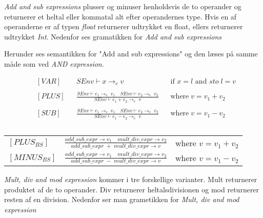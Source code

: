 \textit{Add and sub expressions} plusser og minuser henholdsvis de to operander og returnerer et heltal eller kommatal alt efter operandernes type. Hvis en af operanderne er af typen \textit{float} returnerer udtrykket en float, ellers returnerer udtrykket \textit{Int}. Nedenfor ses gramatikken for \textit{Add and sub expressions}

    
    \noindent Herunder ses semantikken for "Add and sub expressions" og den læses på samme måde som ved \textit{AND expression}.

\begin{align*}
&[VAR] & &SEnv \vdash x \rightarrow_e v & &\text{if } x = l \text{ and } sto\; l = v\\\\
&[PLUS] & &\frac{SEnv \vdash e_1 \rightarrow_e\; v_1\quad SEnv \vdash e_2 \rightarrow_e\; v_2}{SEnv \vdash e_1 + e_2 \rightarrow_e\; v} & &\text{where}\; v = v_1 + v_2\\\\
&[SUB] & &\frac{SEnv \vdash e_1 \rightarrow_e\; v_1\quad SEnv \vdash e_2 \rightarrow_e\; v_2}{SEnv \vdash e_1 - e_2 \rightarrow_e\; v} & &\text{where}\; v = v_1 - v_2\\\\
\end{align*}

\begin{semantik}
    \bgroup
    \def\arraystretch{3}
    \begin{table}[H]
    \centering
    \begin{tabular}{l c l}
        
    $[PLUS_{BS}]$ &$\frac{add\_sub\_expr \rightarrow v_1 \quad mult\_div\_expr \rightarrow v_2}{add\_sub\_expr\;+\;mult\_div\_expr \rightarrow v}$ & where $v = v_1 + v_2$ \\
        
    $[MINUS_{BS}]$ &$\frac{add\_sub\_expr \rightarrow v_1 \quad mult\_div\_expr \rightarrow v_2}{add\_sub\_expr\;-\;mult\_div\_expr \rightarrow v}$ & where $v = v_1 - v_2$ \\
        
    \end{tabular}
    \end{table}
    \egroup
    \caption{Add and sub expression}
    \label{sem:addSubExpr}
\end{semantik}

\textit{Mult, div and mod expression} kommer i tre forskellige varianter. Mult returnerer produktet af de to operander. Div returnerer heltalsdivisionen og mod returnerer resten af en division. Nedenfor ser man grametikken for \textit{Mult, div and mod expression}


